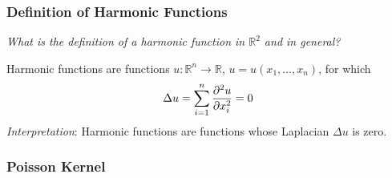 \documentclass[11pt, a4paper]{article}
\newcommand{\question}[1]{\textit{#1}\vspace{2mm}}
\newcommand{\R}{\mathbb{R}} %
\begin{document}
\subsubsection{Definition of Harmonic Functions}
\question{What is the definition of a harmonic function in $ \R^{2} $ and in general?}

Harmonic functions are functions $ u: \R^n \to \R $, $ u = u(x_1, \dots, x_n) $, for which
\begin{equation*}
	\Delta u = \sum_{i=1}^{n} \pdv[2]{u}{x_i} = 0
\end{equation*}
\textit{Interpretation}: Harmonic functions are functions whose Laplacian $ \Delta u $ is zero. 


\subsubsection{Poisson Kernel}
\end{document}
